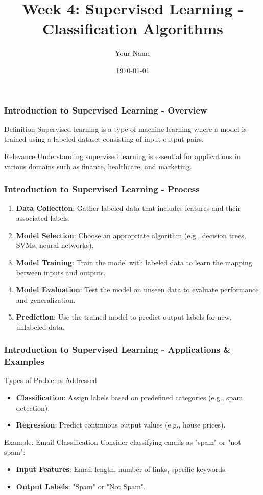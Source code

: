 \documentclass[aspectratio=169]{beamer}
\title[Supervised Learning]{Week 4: Supervised Learning - Classification Algorithms}
\author[Your Name]{Your Name}
\date{\today}
\begin{document}
\frame{\titlepage}

\begin{frame}[fragile]
    \frametitle{Introduction to Supervised Learning - Overview}
    \begin{block}{Definition}
        Supervised learning is a type of machine learning where a model is trained using a labeled dataset consisting of input-output pairs. 
    \end{block}
    \begin{block}{Relevance}
        Understanding supervised learning is essential for applications in various domains such as finance, healthcare, and marketing.
    \end{block}
\end{frame}

\begin{frame}[fragile]
    \frametitle{Introduction to Supervised Learning - Process}
    \begin{enumerate}
        \item \textbf{Data Collection}: Gather labeled data that includes features and their associated labels.
        \item \textbf{Model Selection}: Choose an appropriate algorithm (e.g., decision trees, SVMs, neural networks).
        \item \textbf{Model Training}: Train the model with labeled data to learn the mapping between inputs and outputs.
        \item \textbf{Model Evaluation}: Test the model on unseen data to evaluate performance and generalization.
        \item \textbf{Prediction}: Use the trained model to predict output labels for new, unlabeled data.
    \end{enumerate}
\end{frame}

\begin{frame}[fragile]
    \frametitle{Introduction to Supervised Learning - Applications & Examples}
    \begin{block}{Types of Problems Addressed}
        \begin{itemize}
            \item \textbf{Classification}: Assign labels based on predefined categories (e.g., spam detection).
            \item \textbf{Regression}: Predict continuous output values (e.g., house prices).
        \end{itemize}
    \end{block}
    \begin{block}{Example: Email Classification}
        Consider classifying emails as "spam" or "not spam":
        \begin{itemize}
            \item \textbf{Input Features}: Email length, number of links, specific keywords.
            \item \textbf{Output Labels}: "Spam" or "Not Spam".
        \end{itemize}
    \end{block}
\end{frame}
\end{document}

